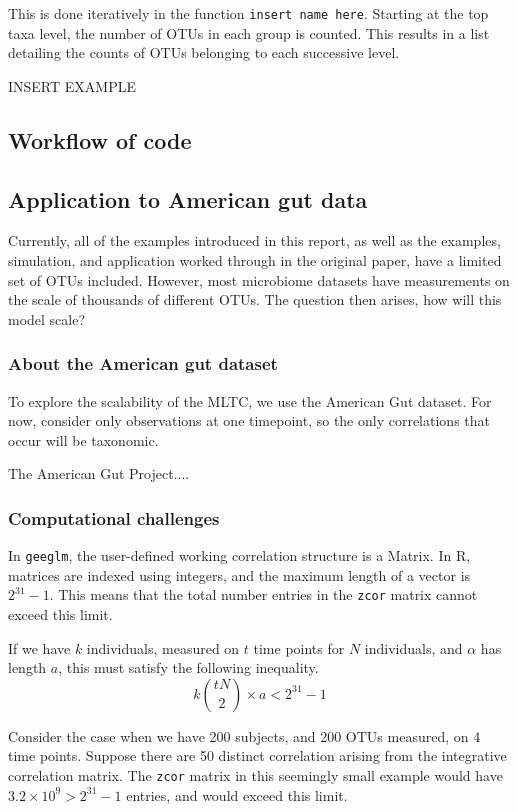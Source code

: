 \documentclass[12pt]{article}
\begin{document}
This is done iteratively in the function \texttt{insert name here}. Starting at the top taxa level, the number of OTUs in each group is counted.
This results in a list detailing the counts of OTUs belonging to each successive level.

INSERT EXAMPLE

\subsection{Workflow of code }

\subsection{Application to American gut data}

Currently, all of the examples introduced in this report, as well as the examples, simulation, and application worked through in the original paper, have a limited set of OTUs included. However, most microbiome datasets have measurements on the scale of thousands of different OTUs. The question then arises, how will this model scale?

\subsubsection{About the American gut dataset}

To explore the scalability of the MLTC, we use the American Gut dataset. For now, consider only observations at one timepoint, so the only correlations that occur will be taxonomic.

The American Gut Project....



\subsubsection{Computational challenges}

In \texttt{geeglm}, the user-defined working correlation structure is a Matrix. In R, matrices are indexed using integers, and the maximum length of a vector is $2^{31}-1$. This means that the total number entries in the \texttt{zcor} matrix cannot exceed this limit.

If we have $k$ individuals, measured on $t$ time points for $N$ individuals, and $\alpha$ has length $a$, this must satisfy the following inequality.
$$ k \binom{tN}{2} \times a < 2^{31}-1$$

Consider the case when we have 200 subjects, and 200 OTUs measured, on 4 time points. Suppose there are 50 distinct correlation arising from the integrative correlation matrix.
The \texttt{zcor} matrix in this seemingly small example would have $3.2 \times 10^9 > 2^{31}-1$ entries, and would exceed this limit.
\end{document}
